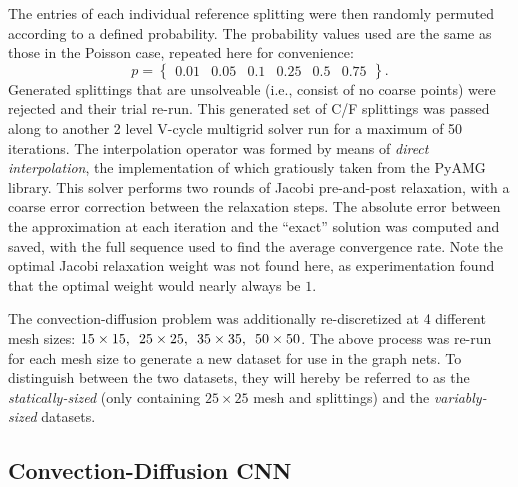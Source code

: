 \documentclass[review]{siamart190516}
\begin{document}
The entries of each individual reference splitting were then randomly permuted according to a defined probability.  The probability values used are the same as those in the Poisson case, repeated here for convenience:
%
\begin{equation} \label{eqn:conv_probabilities}
  p = \begin{Bmatrix} 0.01 & 0.05 & 0.1 & 0.25 & 0.5 & 0.75 \end{Bmatrix}.
\end{equation}
%
Generated splittings that are unsolveable (i.e., consist of no coarse points) were rejected and their trial re-run.  This generated set of C/F splittings was passed along to another 2 level V-cycle multigrid solver run for a maximum of 50 iterations.  The interpolation operator was formed by means of \textit{direct interpolation}, the implementation of which gratiously taken from the PyAMG\cite{pyamg} library.  This solver performs two rounds of Jacobi pre-and-post relaxation, with a coarse error correction between the relaxation steps.  The absolute error between the approximation at each iteration and the ``exact'' solution was computed and saved, with the full sequence used to find the average convergence rate.  Note the optimal Jacobi relaxation weight was not found here, as experimentation found that the optimal weight would nearly always be $1$.

The convection-diffusion problem was additionally re-discretized at 4 different mesh sizes: $15\times 15,\enskip 25\times 25,\enskip 35\times 35,\enskip 50\times 50$.  The above process was re-run for each mesh size to generate a new dataset for use in the graph nets.  To distinguish between the two datasets, they will hereby be referred to as the \textit{statically-sized} (only containing $25 \times 25$ mesh and splittings) and the \textit{variably-sized} datasets.

\subsection{Convection-Diffusion CNN}\label{subsec:conv_cnn}
\end{document}

